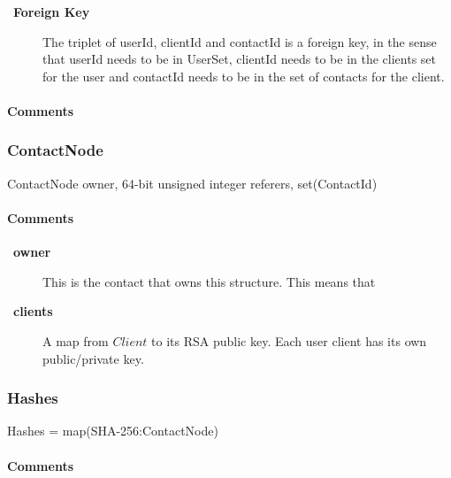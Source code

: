 \documentclass[a4paper,10pt,draft]{article}
\let\Item\item
\newcommand\SpecialItem{\renewcommand\item[1][]{\Item[\textbullet~\bfseries##1]}
}
\begin{document}
\SpecialItem
\begin{description}
 \item[Foreign Key] The triplet of userId, clientId and contactId is a foreign key, in the sense that userId needs to be in UserSet, clientId needs to be in the clients set for 
the user and contactId needs to be in the set of contacts for the client.
\end{description}

\paragraph*{Comments}

\subsubsection{ContactNode}

\begin{verbbox}
ContactNode
{
  owner, 64-bit unsigned integer
  referers, set(ContactId)
}
\end{verbbox}
\begin{center}
\theverbbox
\end{center}

\begin{inparaitem}[ ]
 \item \infrastructure
\end{inparaitem}

\paragraph*{Comments}

\SpecialItem
\begin{description}
 \item[owner] This is the contact that owns this structure. This means that 
 \item[clients] A map from $Client$ to its RSA public key. Each user client has its own public/private key.
\end{description}

\subsubsection{Hashes}
\label{sec:structure:server:hashes}

\begin{verbbox}
Hashes = map(SHA-256:ContactNode)
\end{verbbox}
\begin{center}
\theverbbox
\end{center}

\begin{inparaitem}[ ]
 \item \unique
 \item \persistent
 \item \secure
\end{inparaitem}

\paragraph*{Comments}



\end{document}
